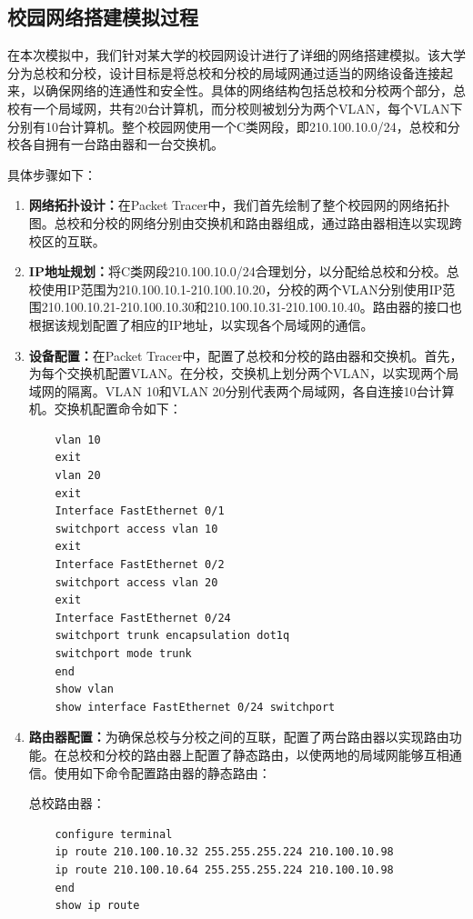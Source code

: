 \documentclass[12pt]{article}
\begin{document}
\subsection{校园网络搭建模拟过程}
在本次模拟中，我们针对某大学的校园网设计进行了详细的网络搭建模拟。该大学分为总校和分校，设计目标是将总校和分校的局域网通过适当的网络设备连接起来，以确保网络的连通性和安全性。具体的网络结构包括总校和分校两个部分，总校有一个局域网，共有20台计算机，而分校则被划分为两个VLAN，每个VLAN下分别有10台计算机。整个校园网使用一个C类网段，即210.100.10.0/24，总校和分校各自拥有一台路由器和一台交换机。

具体步骤如下：

\begin{enumerate}
    \item \textbf{网络拓扑设计：}在Packet Tracer中，我们首先绘制了整个校园网的网络拓扑图。总校和分校的网络分别由交换机和路由器组成，通过路由器相连以实现跨校区的互联。
    
    \item \textbf{IP地址规划：}将C类网段210.100.10.0/24合理划分，以分配给总校和分校。总校使用IP范围为210.100.10.1-210.100.10.20，分校的两个VLAN分别使用IP范围210.100.10.21-210.100.10.30和210.100.10.31-210.100.10.40。路由器的接口也根据该规划配置了相应的IP地址，以实现各个局域网的通信。
    
    \item \textbf{设备配置：}在Packet Tracer中，配置了总校和分校的路由器和交换机。首先，为每个交换机配置VLAN。在分校，交换机上划分两个VLAN，以实现两个局域网的隔离。VLAN 10和VLAN 20分别代表两个局域网，各自连接10台计算机。交换机配置命令如下：
    \begin{verbatim}
    vlan 10
    exit
    vlan 20
    exit
    Interface FastEthernet 0/1
    switchport access vlan 10
    exit
    Interface FastEthernet 0/2
    switchport access vlan 20
    exit
    Interface FastEthernet 0/24
    switchport trunk encapsulation dot1q
    switchport mode trunk
    end
    show vlan
    show interface FastEthernet 0/24 switchport
    \end{verbatim}
    
    \item \textbf{路由器配置：}为确保总校与分校之间的互联，配置了两台路由器以实现路由功能。在总校和分校的路由器上配置了静态路由，以使两地的局域网能够互相通信。使用如下命令配置路由器的静态路由：
    
    总校路由器：
    \begin{verbatim}
    configure terminal
    ip route 210.100.10.32 255.255.255.224 210.100.10.98
    ip route 210.100.10.64 255.255.255.224 210.100.10.98
    end
    show ip route
    \end{verbatim}


\end{enumerate}
\end{document}
